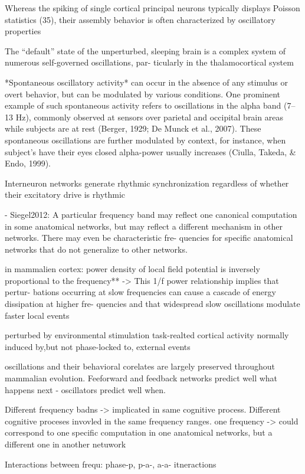 \documentclass[authoryear,review,3p]{elsarticle}
\begin{document}
Whereas the spiking of single cortical principal neurons typically displays Poisson statistics (35), their assembly behavior is often characterized by oscillatory properties

The “default” state of the unperturbed, sleeping brain is a complex system of numerous self-governed oscillations, par- ticularly in the thalamocortical system

*Spontaneous oscillatory activity* can occur in the absence of any stimulus or overt behavior, but can be modulated by various conditions. One prominent example of such spontaneous activity refers to oscillations in the alpha band (7–13 Hz), commonly observed at sensors over parietal and occipital brain areas while subjects are at rest (Berger, 1929; De Munck et al., 2007). These spontaneous oscillations are further modulated by context, for instance, when subject’s have their eyes closed alpha-power usually increases (Ciulla, Takeda, & Endo, 1999).

Interneuron networks generate rhythmic synchronization regardless of whether their excitatory drive is rhythmic

- Siegel2012: A particular frequency band may reflect one canonical computation in some anatomical networks, but may reflect a different mechanism in other networks. There may even be characteristic fre- quencies for specific anatomical networks that do not generalize to other networks. 

in mammalien cortex: power density of local field potential is inversely proportional to the frequency** -> This 1/f power relationship implies that pertur- bations occurring at slow frequencies can cause a cascade of energy dissipation at higher fre- quencies and that widespread slow oscillations modulate faster local events

perturbed by environmental stimulation
task-realted cortical activity normally induced by,but not phase-locked
to, external events

oscillations and their behavioral corelates are largely preserved
throughout mammalian evolution.
Feeforward and feedback networks predict well what happens next -
oscillators predict well when.

Different frequency badns -> implicated in same cognitive process.
Different cognitive proceses invovled in the same frequency ranges.
one frequency -> could correspond to one specific computation in
one anatomical networks, but a different one in another netuwork

Interactions between frequ: phase-p, p-a-, a-a- itneractions
\end{document}
